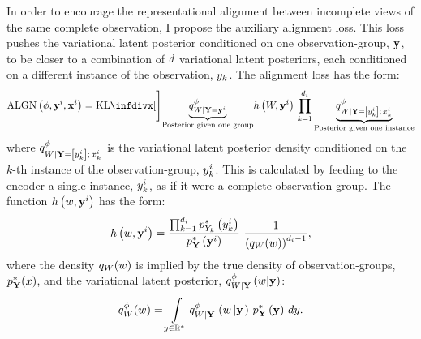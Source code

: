 \documentclass[../thesis.tex]{subfiles}
\begin{document}
In order to encourage the representational alignment between incomplete views of the same complete observation, I propose the auxiliary alignment loss. This loss pushes the variational latent posterior conditioned on one observation-group, $\mathbf{{y}}$, to be closer to a combination of $d$ variational latent posteriors, each conditioned on a different instance of the observation, $y_k$. The alignment loss has the form:
\begin{equation} \label{eq:MIVAE-imputation-loss}
    \mathrm{ALGN} \left( \phi, \mygroup{\myvect{y}}^i, \mygroup{\myvect{x}}^i \right) = \kl[\Bigg]{ 
    \underbrace{\myfunc{q}^{\phi}_{\myrv{w} | \mygroup{\myrv{y}} = \mygroup{\myvect{y}}^i}}_{\text{Posterior given one group}} 
    }{ 
    \myfunc{h} \left( \myrv{w}, \mygroup{\myvect{y}}^i \right) \, \prod_{k=1}^{\mycnt{d}_i} \underbrace{\myfunc{q}^{\phi}_{\myrv{w} | \mygroup{\myrv{y}} = \left[ \myvect{y}^i_k \right]; \, \myvect{x}^i_k}}_{\text{Posterior given one instance}} }
\end{equation}
where $\myfunc{q}^{\phi}_{\myrv{w} | \mygroup{\myrv{y}} = \left[ \myvect{y}^i_k \right]; \, \myvect{x}^i_k}$ is the variational latent posterior density conditioned on the $k$-th instance of the observation-group, $y^i_k$. This is calculated by feeding to the encoder a single instance, $y^i_k$, as if it were a complete observation-group. The function $h\left( w, \mathbf{{y}}^i \right)$ has the form:
\begin{equation} \label{eq:MIVAE-h-func}
    \myfunc{h}\left( \myvect{w}, \mygroup{\myvect{y}}^i \right) = \frac{\prod_{k=1}^{\mycnt{d}_i} \myfunc{p}^{*}_{\myrv{y}_k} \left( \myvect{y}^i_k \right)}{\myfunc{p}^{*}_{\mygroup{\myrv{y}}} \left( \mygroup{\myvect{y}}^i \right)} ~ \frac{1}{\left( \myfunc{q}_{\myrv{w}} (\myvect{w}) \right)^{\mycnt{d}_i - 1}},
\end{equation}
where the density $\myfunc{q}_{\myrv{w}} (\myvect{w})$ is implied by the true density of observation-groups, $\myfunc{p}^{*}_{\mygroup{\myrv{y}}} (\myvect{x})$, and the variational latent posterior, $\myfunc{q}^{\phi}_{\myrv{w} | \mygroup{\myrv{y}}} \left( \myvect{w} | \mygroup{\myvect{y}} \right)$:
\begin{equation}
    \myfunc{q}^{\phi}_{\myrv{w}} (\myvect{w}) = \int\limits_{\myvect{y} \in \mathbb{R}^{*}} \myfunc{q}^{\phi}_{\myrv{w} \left\vert \mygroup{\myrv{y}} \right. } \left( \myvect{w} \left\vert \mygroup{\myvect{y}} \right. \right) \, \myfunc{p}^{*}_{\mygroup{\myrv{y}}} \left( \mygroup{\myvect{y}} \right) \, d\myvect{y}.
\end{equation}
\end{document}

